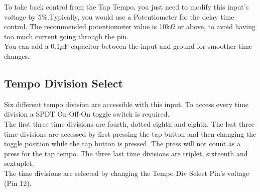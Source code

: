 \documentclass[a4paper, 10pt]{article}
\begin{document}
To take back control from the Tap Tempo, you just need to modify this input's voltage by 5\%.Typically, you would use a Potentiometer for the delay time control. The recommended potentiometer value is 10k$\Omega$ or above, to avoid having too much current going through the pin.\\

You can add a 0.1$\mu$F capacitor between the input and ground for smoother time changes.\\

\subsection{Tempo Division Select}
\label{subsec:tempodiv}
\bigbreak
Six different tempo division are accessible with this input. To access every time division a SPDT On-Off-On toggle switch is required.\\

The first three time divisions are fourth, dotted eighth and eighth. The last three time divisions are accessed by first pressing the tap button and then changing the toggle position while the tap button is pressed. The press will not count as a press for the tap tempo. The three last time divisions are triplet, sixteenth and sextuplet.\\

The time divisions are selected by changing the Tempo Div Select Pin's voltage (Pin 12).\\
\end{document}
